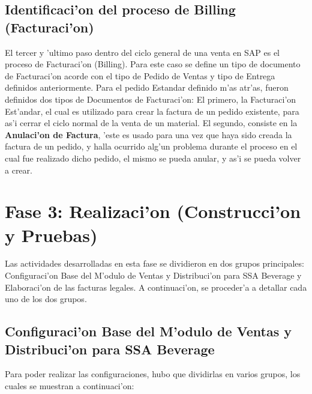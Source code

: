 \subsection{Identificaci'on del proceso de Billing (Facturaci'on)}
	El tercer y 'ultimo paso dentro del ciclo general de una venta en SAP es el proceso de Facturaci'on (Billing). Para este caso se define un tipo de documento de Facturaci'on acorde con el tipo de Pedido de Ventas y tipo de Entrega definidos anteriormente.
\newline
\newline
\indent Para el pedido Estandar definido m'as atr'as, fueron definidos dos tipos de Documentos de Facturaci'on: El primero, la Facturaci'on Est'andar, el cual es utilizado para crear la factura de un pedido existente, para as'i cerrar el ciclo normal de la venta de un material. El segundo, consiste en la \textbf{Anulaci'on de Factura}, 'este es usado para una vez que haya sido creada la factura de un pedido, y halla ocurrido alg'un problema durante el proceso en el cual fue realizado dicho pedido, el mismo se pueda anular, y as'i se pueda volver a crear.

\section{Fase 3: Realizaci'on (Construcci'on y Pruebas)}
	Las actividades desarrolladas en esta fase se dividieron en dos grupos principales: Configuraci'on Base del M'odulo de Ventas y Distribuci'on para SSA Beverage y Elaboraci'on de las facturas legales.
\newline
\newline
\indent A continuaci'on, se proceder'a a detallar cada uno de los dos grupos.
\subsection{Configuraci'on Base del M'odulo de Ventas y Distribuci'on para SSA Beverage}
	Para poder realizar las configuraciones, hubo que dividirlas en varios grupos, los cuales se muestran a continuaci'on:
